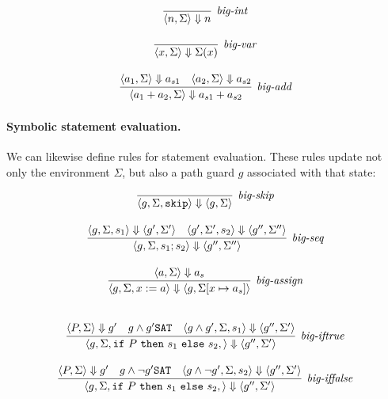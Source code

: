 \documentclass[11pt]{article}
\begin{document}
\[
\begin{array}{c}	
\infer[$\textit{big-int}$]{\langle n, \Sigma  \rangle \Downarrow n}{} \\[3ex]
\infer[$\textit{big-var}$]{\langle x, \Sigma \rangle \Downarrow \Sigma(x)} {} \\[3ex]
\infer[\textit{big-add}]{\langle a_1 + a_2, \Sigma  \rangle \Downarrow a_{s1} + a_{s2}}{\langle a_1, \Sigma \rangle \Downarrow a_{s1}& \langle a_2, \Sigma \rangle \Downarrow a_{s2}} \\
\end{array}
\]

\paragraph{Symbolic statement evaluation.} We can likewise define rules for statement evaluation. These rules 
update not only the environment $\Sigma$, but also a path guard $g$ associated with that state:

\[
\begin{array}{c}	

\infer[\textit{big-skip}]{\langle g,\Sigma, \mathtt{skip}  \rangle \Downarrow \langle g, \Sigma \rangle}{} \\[3ex]

\infer[\textit{big-seq}]{\langle g,\Sigma, s_1 ; s_2 \rangle \Downarrow \langle g'',\Sigma'' \rangle}{\langle g,\Sigma, s_1 \rangle \Downarrow \langle g',\Sigma' \rangle
 & \langle g',\Sigma', s_2 \rangle \Downarrow \langle g'',\Sigma'' \rangle} \\[3ex]

\infer[\textit{big-assign}]{\langle g,\Sigma, x := a \rangle \Downarrow \langle g,\Sigma[x \mapsto a_s] \rangle} {\langle a,\Sigma \rangle \Downarrow a_s} \\[3ex]

\end{array}
\]

\[
\begin{array}{c}
 
\infer[\textit{big-iftrue}]
    {\langle g,\Sigma, \mathtt{if}~P~\mathtt{then}~s_1~\mathtt{else}~s_2, \rangle \Downarrow \langle g'',\Sigma' \rangle}
    {\langle P,\Sigma \rangle \Downarrow g' & g \land g' \texttt{SAT} & \langle g \land g',\Sigma, s_1 \rangle \Downarrow \langle g'',\Sigma' \rangle} \\[3ex]

\infer[\textit{big-iffalse}]
    {\langle g,\Sigma, \mathtt{if}~P~\mathtt{then}~s_1~\mathtt{else}~s_2, \rangle \Downarrow \langle g'',\Sigma' \rangle}
    {\langle P,\Sigma \rangle \Downarrow g' & g \land \lnot g' \texttt{SAT} & \langle g \land \lnot g',\Sigma, s_2 \rangle \Downarrow \langle g'',\Sigma' \rangle} \\[3ex]

 
\end{array}
\]
\end{document}
